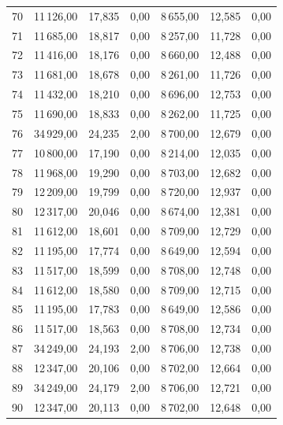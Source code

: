 \begin{longtable}{lrrrrrr}
70 & 11\,126,00 & 17,835 & 0,00 & 8\,655,00 & 12,585 & 0,00 \\
71 & 11\,685,00 & 18,817 & 0,00 & 8\,257,00 & 11,728 & 0,00 \\
72 & 11\,416,00 & 18,176 & 0,00 & 8\,660,00 & 12,488 & 0,00 \\
73 & 11\,681,00 & 18,678 & 0,00 & 8\,261,00 & 11,726 & 0,00 \\
74 & 11\,432,00 & 18,210 & 0,00 & 8\,696,00 & 12,753 & 0,00 \\
75 & 11\,690,00 & 18,833 & 0,00 & 8\,262,00 & 11,725 & 0,00 \\
76 & 34\,929,00 & 24,235 & 2,00 & 8\,700,00 & 12,679 & 0,00 \\
77 & 10\,800,00 & 17,190 & 0,00 & 8\,214,00 & 12,035 & 0,00 \\
78 & 11\,968,00 & 19,290 & 0,00 & 8\,703,00 & 12,682 & 0,00 \\
79 & 12\,209,00 & 19,799 & 0,00 & 8\,720,00 & 12,937 & 0,00 \\
80 & 12\,317,00 & 20,046 & 0,00 & 8\,674,00 & 12,381 & 0,00 \\
81 & 11\,612,00 & 18,601 & 0,00 & 8\,709,00 & 12,729 & 0,00 \\
82 & 11\,195,00 & 17,774 & 0,00 & 8\,649,00 & 12,594 & 0,00 \\
83 & 11\,517,00 & 18,599 & 0,00 & 8\,708,00 & 12,748 & 0,00 \\
84 & 11\,612,00 & 18,580 & 0,00 & 8\,709,00 & 12,715 & 0,00 \\
85 & 11\,195,00 & 17,783 & 0,00 & 8\,649,00 & 12,586 & 0,00 \\
86 & 11\,517,00 & 18,563 & 0,00 & 8\,708,00 & 12,734 & 0,00 \\
87 & 34\,249,00 & 24,193 & 2,00 & 8\,706,00 & 12,738 & 0,00 \\
88 & 12\,347,00 & 20,106 & 0,00 & 8\,702,00 & 12,664 & 0,00 \\
89 & 34\,249,00 & 24,179 & 2,00 & 8\,706,00 & 12,721 & 0,00 \\
90 & 12\,347,00 & 20,113 & 0,00 & 8\,702,00 & 12,648 & 0,00 \\
\end{longtable}
\endgroup
